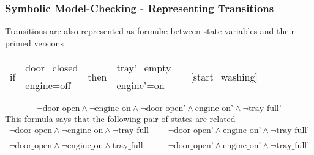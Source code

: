 \begin{frame}
  \frametitle{Symbolic Model-Checking - Representing Transitions}

  \scriptsize

  Transitions are also represented as formul\ae\xspace between state
  variables and their primed versions 
  \vfill
  \begin{tabular}{llllcl}
    \multirow{2}{*}{if} & door=closed & \multirow{2}{*}{then} & tray'=empty & & \multirow{2}{*}{[start\_washing]} \\ 
                        & engine=off  &                       & engine'=on  & &                                   \\
  \end{tabular}
  \vfill
  $$
    \neg \mbox{door\_open} \wedge \neg \mbox{engine\_on} \wedge \neg \mbox{door\_open'} \wedge \mbox{engine\_on'} \wedge \neg \mbox{tray\_full'}
  $$
  \vfill\pause
  This formula says that the following pair of states are related
  $$
  \begin{array}{rcl}
    \neg \mbox{door\_open} \wedge \neg \mbox{engine\_on} \wedge \neg \mbox{tray\_full} 
    & ~~~ & \neg \mbox{door\_open'} \wedge \mbox{engine\_on'} \wedge \neg \mbox{tray\_full'} \\
    \\
    \neg \mbox{door\_open} \wedge \neg \mbox{engine\_on} \wedge \mbox{tray\_full} 
    & ~~~ & \neg \mbox{door\_open'} \wedge \mbox{engine\_on'} \wedge \neg \mbox{tray\_full'} 
  \end{array}
  $$

\end{frame}

